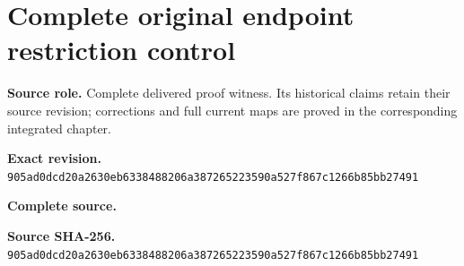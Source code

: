 \begingroup
\sloppy
\small
\clearpage
\section{Complete original endpoint restriction control}
\noindent\textbf{Source role.} Complete delivered proof witness. Its historical claims retain their source revision; corrections and full current maps are proved in the corresponding integrated chapter.\par
\noindent\textbf{Exact revision.} \nolinkurl{905ad0dcd20a2630eb6338488206a387265223590a527f867c1266b85bb27491}\par
\noindent\textbf{Complete source.} \par
\noindent\textbf{Source SHA-256.} \nolinkurl{905ad0dcd20a2630eb6338488206a387265223590a527f867c1266b85bb27491}\par\medskip

\endgroup
